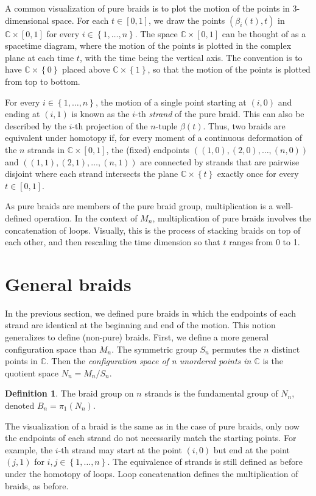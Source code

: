 \documentclass[12pt]{report}
\newcommand{\C}{\mathbb{C}}
\theoremstyle{definition}
\newtheorem{definition}{Definition}[chapter]
\begin{document}
A common visualization of pure braids is to plot the motion of the points in 3-dimensional space. For each $t\in [0,1]$, we draw the points $\left( \beta_i(t),t \right)$ in $\C\times[0,1]$ for every $i\in\left\{ 1,\dots,n \right\}$. The space $\C\times[0,1]$ can be thought of as a spacetime diagram, where the motion of the points is plotted in the complex plane at each time $t$, with the time being the vertical axis. The convention is to have $\C\times\left\{ 0 \right\}$ placed above $\C\times\left\{ 1 \right\}$, so that the motion of the points is plotted from top to bottom.

For every $i\in\left\{ 1,\dots,n \right\}$, the motion of a single point starting at $(i,0)$ and ending at $(i,1)$ is known as the $i$-th \textit{strand} of the pure braid. This can also be described by the $i$-th projection of the $n$-tuple $\beta(t)$. Thus, two braids are equivalent under homotopy if, for every moment of a continuous deformation of the $n$ strands in $\C\times [0,1]$, the (fixed) endpoints $((1,0),(2,0),\dots,(n,0))$ and $((1,1),(2,1),\dots,(n,1))$ are connected by strands that are pairwise disjoint where each strand intersects the plane $\C\times\left\{ t \right\}$ exactly once for every $t\in[0,1]$.

As pure braids are members of the pure braid group, multiplication is a well-defined operation. In the context of $M_n$, multiplication of pure braids involves the concatenation of loops. Visually, this is the process of stacking braids on top of each other, and then rescaling the time dimension so that $t$ ranges from 0 to 1.

\section{General braids}
In the previous section, we defined pure braids in which the endpoints of each strand are identical at the beginning and end of the motion. This notion generalizes to define (non-pure) braids. First, we define a more general configuration space than $M_n$. The symmetric group $S_n$ permutes the $n$ distinct points in $\C$. Then the \textit{configuration space of n unordered points in $\C$} is the quotient space $N_n = M_n/S_n$.

\begin{definition}
    The braid group on $n$ strands is the fundamental group of $N_n$, denoted $B_n = \pi_1(N_n)$.
\end{definition}

The visualization of a braid is the same as in the case of pure braids, only now the endpoints of each strand do not necessarily match the starting points. For example, the $i$-th strand may start at the point $(i,0)$ but end at the point $(j,1)$ for $i,j\in\left\{ 1,\dots,n \right\}$. The equivalence of strands is still defined as before under the homotopy of loops. Loop concatenation defines the multiplication of braids, as before.
\end{document}
